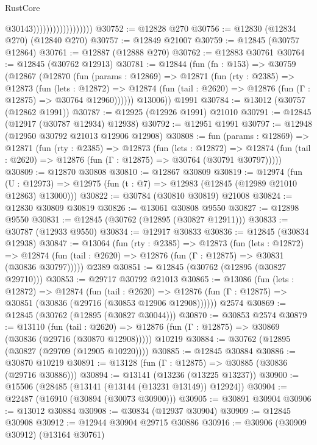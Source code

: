 \begin{lexlean}{RustCore}
\begin{coremodule}
                                        @30143))))))))))))))))))
@30752 := @12828 @270
@30756 := @12830 (@12834 @270) (@12840 @270)
@30757 := @12849 @21007
@30759 := @12845 (@30757 @12864)
@30761 := @12887 (@12888 @270)
@30762 := @12883 @30761
@30764 := @12845 (@30762 @12913)
@30781 := @12844
    (fun (fn : @153) =>
    @30759
      (@12867
        (@12870
          (fun (params : @12869) =>
          @12871
            (fun (rty : @2385) =>
            @12873
              (fun (lets : @12872) =>
              @12874 (fun (tail : @2620) => @12876 (fun (Γ : @12875) => @30764 @12960))))))
        @13006))
    @1991
@30784 := @13012 (@30757 (@12862 @1991))
@30787 := @12925 (@12926 @1991) @21010
@30791 := @12845 (@12917 (@30787 @12934) @12938)
@30792 := @12951 @1991
@30797 := @12948 (@12950 @30792 @21013 @12906 @12908)
@30808 := fun (params : @12869) =>
  @12871
    (fun (rty : @2385) =>
    @12873
      (fun (lets : @12872) =>
      @12874 (fun (tail : @2620) => @12876 (fun (Γ : @12875) => @30764 (@30791 @30797)))))
@30809 := @12870 @30808
@30810 := @12867 @30809
@30819 := @12974
    (fun (U : @12973) => @12975 (fun (t : @7) => @12983 (@12845 (@12989 @21010 @12863) @13000)))
@30822 := @30784 (@30810 @30819) @21008
@30824 := @12830 @30809 @30819
@30826 := @13061 @30808 @9550
@30827 := @12898 @9550
@30831 := @12845 (@30762 (@12895 (@30827 @12911)))
@30833 := @30787 (@12933 @9550)
@30834 := @12917 @30833
@30836 := @12845 (@30834 @12938)
@30847 := @13064
    (fun (rty : @2385) =>
    @12873
      (fun (lets : @12872) =>
      @12874 (fun (tail : @2620) => @12876 (fun (Γ : @12875) => @30831 (@30836 @30797)))))
    @2389
@30851 := @12845 (@30762 (@12895 (@30827 @29710)))
@30853 := @29717 @30792 @21013
@30865 := @13086
    (fun (lets : @12872) =>
    @12874
      (fun (tail : @2620) =>
      @12876 (fun (Γ : @12875) => @30851 (@30836 (@29716 (@30853 @12906 @12908))))))
    @2574
@30869 := @12845 (@30762 (@12895 (@30827 @30044)))
@30870 := @30853 @2574
@30879 := @13110
    (fun (tail : @2620) => @12876 (fun (Γ : @12875) => @30869 (@30836 (@29716 (@30870 @12908)))))
    @10219
@30884 := @30762 (@12895 (@30827 (@29709 (@12905 @10220))))
@30885 := @12845 @30884
@30886 := @30870 @10219
@30891 := @13128 (fun (Γ : @12875) => @30885 (@30836 (@29716 @30886)))
@30894 := @13141 (@13236 (@13225 @13237))
@30900 := @15506 (@28485 (@13141 (@13144 (@13231 @13149)) @12924))
@30904 := @22487 (@16910 (@30894 (@30073 @30900)))
@30905 := @30891 @30904
@30906 := @13012 @30884
@30908 := @30834 (@12937 @30904)
@30909 := @12845 @30908
@30912 := @12944 @30904 @29715 @30886
@30916 := @30906 (@30909 @30912) (@13164 @30761)

\end{coremodule}
\end{lexlean}
